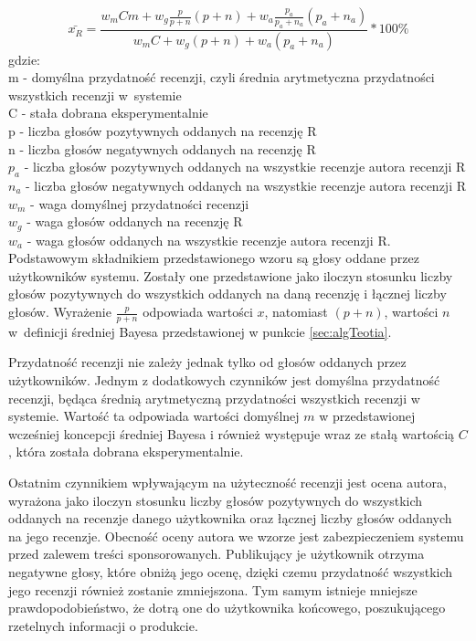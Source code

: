 \begin{equation}
\bar{x_{R}}=\frac{w_{m}Cm+w_{g}\frac{p}{p+n}(p+n)+w_{a}\frac{p_{a}}{p_{a}+n_{a}}(p_{a}+n_{a})}{w_{m}C+w_{g}(p+n)+w_{a}(p_{a}+n_{a})}*100\%
\end{equation}
gdzie:\\
m - domyślna przydatność recenzji, czyli średnia arytmetyczna przydatności wszystkich recenzji w~systemie\\
C - stała dobrana eksperymentalnie\\
p - liczba głosów pozytywnych oddanych na recenzję R\\
n - liczba głosów negatywnych oddanych na recenzję R\\
$p_{a}$ - liczba głosów pozytywnych oddanych na wszystkie recenzje autora recenzji R\\
$n_{a}$ - liczba głosów negatywnych oddanych na wszystkie recenzje autora recenzji R\\
$w_{m}$ - waga domyślnej przydatności recenzji\\
$w_{g}$ - waga głosów oddanych na recenzję R\\
$w_{a}$ - waga głosów oddanych na wszystkie recenzje autora recenzji R.\\


Podstawowym składnikiem przedstawionego wzoru są głosy oddane przez użytkowników systemu. Zostały one przedstawione jako iloczyn stosunku liczby głosów pozytywnych do wszystkich oddanych na daną recenzję i łącznej liczby głosów. Wyrażenie $\frac{p}{p+n}$ odpowiada wartości $x$, natomiast $(p + n)$, wartości $n$ w~definicji średniej Bayesa przedstawionej w punkcie \ref{sec:algTeotia}.

Przydatność recenzji nie zależy jednak tylko od głosów oddanych przez użytkowników. Jednym z dodatkowych czynników jest domyślna przydatność recenzji, będąca średnią arytmetyczną przydatności wszystkich recenzji w systemie. Wartość ta odpowiada wartości domyślnej $m$ w przedstawionej wcześniej koncepcji średniej Bayesa i również występuje wraz ze stałą wartością $C$, która została dobrana eksperymentalnie.

Ostatnim czynnikiem wpływającym na użyteczność recenzji jest ocena autora, wyrażona jako iloczyn stosunku liczby głosów pozytywnych do wszystkich oddanych na recenzje danego użytkownika oraz łącznej liczby głosów oddanych na jego recenzje. Obecność oceny autora we wzorze jest zabezpieczeniem systemu przed zalewem treści sponsorowanych. Publikujący je użytkownik otrzyma negatywne głosy, które obniżą jego ocenę, dzięki czemu przydatność wszystkich jego recenzji również zostanie zmniejszona. Tym samym istnieje mniejsze prawdopodobieństwo, że dotrą one do użytkownika końcowego, poszukującego rzetelnych informacji o produkcie. 

